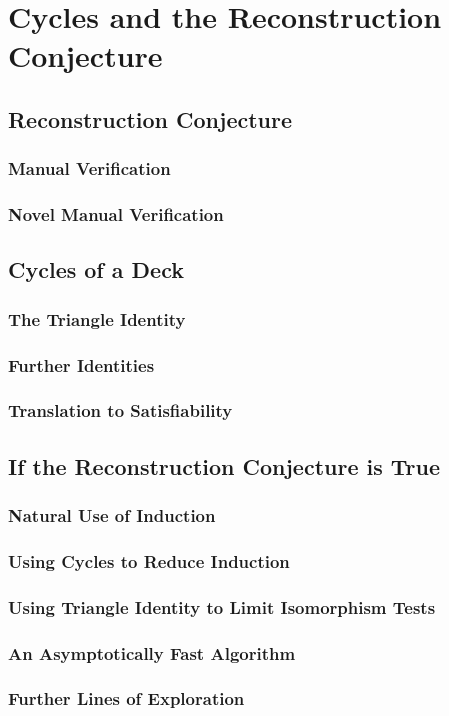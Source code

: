 \chapter{Cycles and the Reconstruction Conjecture}

\section{Reconstruction Conjecture}

\subsection{Manual Verification}
\subsection{Novel Manual Verification}

\section{Cycles of a Deck}
\subsection{The Triangle Identity}
\subsection{Further Identities}
\subsection{Translation to Satisfiability}

\section{If the Reconstruction Conjecture is True}
\subsection{Natural Use of Induction}
\subsection{Using Cycles to Reduce Induction}
\subsection{Using Triangle Identity to Limit Isomorphism Tests}
\subsection{An Asymptotically Fast Algorithm}
\subsection{Further Lines of Exploration}